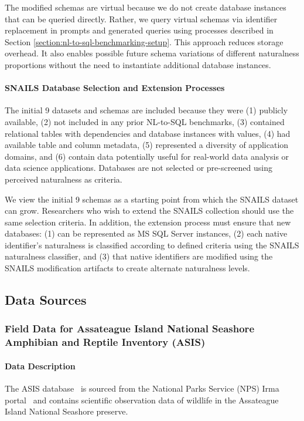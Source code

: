 The modified schemas are virtual because we do not create database instances that can be queried directly.
Rather, we query virtual schemas via identifier replacement in prompts and generated queries using processes described in Section \ref{section:nl-to-sql-benchmarking-setup}.
This approach reduces storage overhead.
It also enables possible future schema variations of different naturalness proportions without the need to instantiate additional database instances.

\paragraph{\textbf{SNAILS Database Selection and Extension Processes}}
The initial 9 datasets and schemas are included because they were (1) publicly available, (2) not included in any prior NL-to-SQL benchmarks, (3) contained relational tables with dependencies and database instances with values, (4) had available table and column metadata, (5) represented a diversity of application domains, and (6) contain data potentially useful for real-world data analysis or data science applications.
Databases are not selected or pre-screened using perceived naturalness as criteria.

We view the initial 9 schemas as a starting point from which the SNAILS dataset can grow.
Researchers who wish to extend the SNAILS collection should use the same selection criteria.
In addition, the extension process must ensure that new databases:  (1) can be represented as MS SQL Server instances, (2) each native identifier's naturalness is classified according to defined criteria using the SNAILS naturalness classifier, and (3) that native identifiers are modified using the SNAILS modification artifacts to create alternate naturalness levels. 

\subsection{Data Sources}

\subsubsection{Field Data for Assateague Island National Seashore Amphibian and Reptile Inventory (ASIS)}

\paragraph{Data Description} 
The ASIS database~\cite{assateague-herp} is sourced from the National Parks Service (NPS) Irma portal~\cite{nps-irma-portal} and contains scientific observation data of wildlife in the Assateague Island National Seashore preserve.

